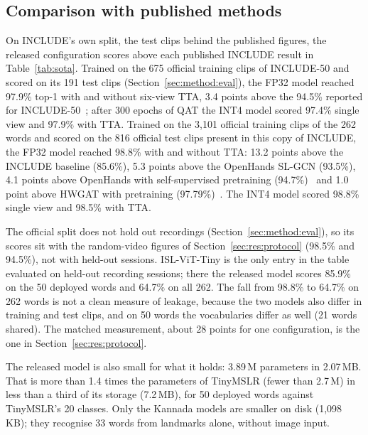 \documentclass[pdflatex,sn-mathphys-num,twocolumn,lineno]{sn-jnl}
\theoremstyle{thmstyleone}%
\begin{document}
\subsection{Comparison with published methods}\label{sec:res:sota}

On INCLUDE's own split, the test clips behind the published figures, the released configuration scores above each published INCLUDE result in Table~\ref{tab:sota}. Trained on the 675 official training clips of INCLUDE-50 and scored on its 191 test clips (Section~\ref{sec:method:eval}), the FP32 model reached 97.9\% top-1 with and without six-view TTA, 3.4 points above the 94.5\% reported for INCLUDE-50~\cite{sridhar2020include}; after 300 epochs of QAT the INT4 model scored 97.4\% single view and 97.9\% with TTA. Trained on the 3,101 official training clips of the 262 words and scored on the 816 official test clips present in this copy of INCLUDE, the FP32 model reached 98.8\% with and without TTA: 13.2 points above the INCLUDE baseline (85.6\%), 5.3 points above the OpenHands SL-GCN (93.5\%), 4.1 points above OpenHands with self-supervised pretraining (94.7\%)~\cite{selvaraj2022openhands} and 1.0 point above HWGAT with pretraining (97.79\%)~\cite{patra2024hwgat}. The INT4 model scored 98.8\% single view and 98.5\% with TTA.

The official split does not hold out recordings (Section~\ref{sec:method:eval}), so its scores sit with the random-video figures of Section~\ref{sec:res:protocol} (98.5\% and 94.5\%), not with held-out sessions. ISL-ViT-Tiny is the only entry in the table evaluated on held-out recording sessions; there the released model scores 85.9\% on the 50 deployed words and 64.7\% on all 262. The fall from 98.8\% to 64.7\% on 262 words is not a clean measure of leakage, because the two models also differ in training and test clips, and on 50 words the vocabularies differ as well (21 words shared). The matched measurement, about 28 points for one configuration, is the one in Section~\ref{sec:res:protocol}.

The released model is also small for what it holds: 3.89\,M parameters in 2.07\,MB. That is more than 1.4 times the parameters of TinyMSLR (fewer than 2.7\,M) in less than a third of its storage (7.2\,MB), for 50 deployed words against TinyMSLR's 20 classes. Only the Kannada models are smaller on disk (1,098\,KB); they recognise 33 words from landmarks alone, without image input.
\end{document}
